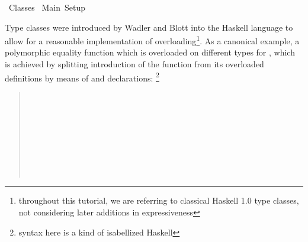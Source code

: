 %
\begin{isabellebody}%
\def\isabellecontext{Classes}%
%
\isadelimtheory
%
\endisadelimtheory
%
\isatagtheory
{}\isamarkupfalse%
\ Classes\isanewline
{}\ Main\ Setup\isanewline
{}%
\endisatagtheory
{\isafoldtheory}%
%
\isadelimtheory
%
\endisadelimtheory
%
\isamarkuptrue%
%
\begin{isamarkuptext}%
Type classes were introduced by Wadler and Blott \cite{wadler89how}
  into the Haskell language to allow for a reasonable implementation
  of overloading\footnote{throughout this tutorial, we are referring
  to classical Haskell 1.0 type classes, not considering
  later additions in expressiveness}.
  As a canonical example, a polymorphic equality function
   which is overloaded on different
  types for \isa{{\isasymalpha}}, which is achieved by splitting introduction
  of the  function from its overloaded definitions by means
  of  and  declarations:
  \footnote{syntax here is a kind of isabellized Haskell}

  \begin{quote}

  \noindent{} \\
  \hspace*{2ex}

  \medskip\noindent{} \\
  \hspace*{2ex} \\
  \hspace*{2ex} \\
  \hspace*{2ex} \\
  \hspace*{2ex}

  \medskip\noindent{} \\
  \hspace*{2ex}


\end{quote}
\end{isamarkuptext}
\end{isabellebody}
